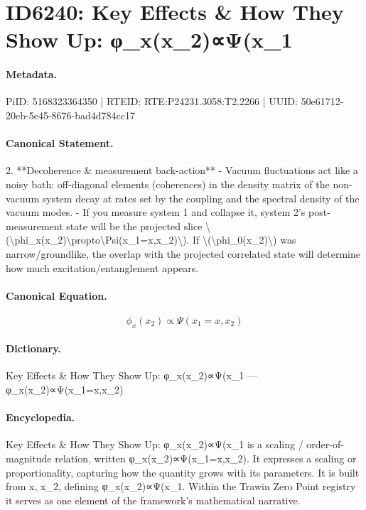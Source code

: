 \section*{ID6240: Key Effects \& How They Show Up: φ\_x(x\_2)∝Ψ(x\_1}
\paragraph{Metadata.}
PiID: 5168323364350 | RTEID: RTE:P24231.3058:T2.2266 | UUID: 50e61712-20eb-5e45-8676-bad4d784cc17

\paragraph{Canonical Statement.}
2. **Decoherence \& measurement back-action** - Vacuum fluctuations act like a noisy bath: off-diagonal elements (coherences) in the density matrix of the non-vacuum system decay at rates set by the coupling and the spectral density of the vacuum modes. - If you measure system 1 and collapse it, system 2’s post-measurement state will be the projected slice \textbackslash{}(\textbackslash{}phi\_x(x\_2)\textbackslash{}propto\textbackslash{}Psi(x\_1=x,x\_2)\textbackslash{}). If \textbackslash{}(\textbackslash{}phi\_0(x\_2)\textbackslash{}) was narrow/groundlike, the overlap with the projected correlated state will determine how much excitation/entanglement appears.

\paragraph{Canonical Equation.}
\[
\phi_x(x_2)\propto\Psi(x_1=x,x_2)
\]

\paragraph{Dictionary.}
Key Effects \& How They Show Up: φ\_x(x\_2)∝Ψ(x\_1 — φ\_x(x\_2)∝Ψ(x\_1=x,x\_2)

\paragraph{Encyclopedia.}
Key Effects \& How They Show Up: φ\_x(x\_2)∝Ψ(x\_1 is a scaling / order-of-magnitude relation, written φ\_x(x\_2)∝Ψ(x\_1=x,x\_2). It expresses a scaling or proportionality, capturing how the quantity grows with its parameters. It is built from x, x\_2, defining φ\_x(x\_2)∝Ψ(x\_1. Within the Trawin Zero Point registry it serves as one element of the framework's mathematical narrative.
